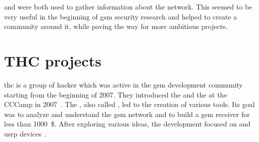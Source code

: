        and  were both used to
      gather information about the network. This seemed to be very
      useful in the beginning of \gls{gsm} security research and helped
      to create a community around it, while paving the way for more
      ambitious projects.

    \section{THC projects}

      \gls{thc} is a group of hacker which was active in the \gls{gsm}
      development community starting from the beginning of 2007. They
      introduced the  and the  at the CCCamp in 2007~\cite{hulton_a5_2007}. The
      , also called , led to the creation of various tools. Its goal
      was to analyze and understand the \gls{gsm} network and to build a
      \gls{gsm} receiver for less than \SI{1000}{\$}. After exploring
      various ideas, the development focused on  and
      \gls{usrp} devices~\cite{gsm_2009}.

